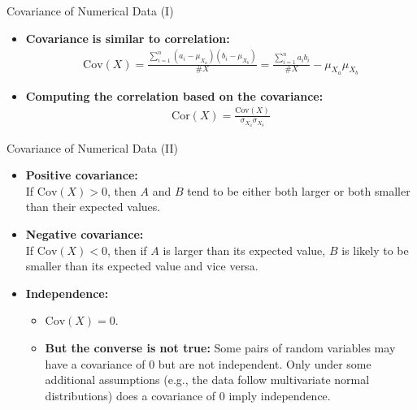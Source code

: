 \begin{frame}{Covariance of Numerical Data (I)}
	\begin{itemize}
		\item \textbf{\color{airforceblue}Covariance} \textbf{is similar to
			      correlation:}\\
		      \begin{align}
			      \text{Cov}(X) =
			      \frac{\sum_{i=1}^{n}(a_i-\mu_{X_a})(b_i-\mu_{X_b})}{\#X} =
			      \frac{\sum_{i=1}^{n}a_ib_i}{\#X}-\mu_{X_a}\mu_{X_b}
		      \end{align}
		\item \textbf{Computing the correlation based on the covariance:}\\
		      \begin{align}
			      \text{Cor}({X}) = \frac{\text{Cov}(X)}{\sigma_{X_a}\sigma_{X_b}}
		      \end{align}
	\end{itemize}
\end{frame}

\begin{frame}{Covariance of Numerical Data (II)}
	\begin{itemize}
		\item \textbf{Positive covariance:}\\
		      If $\text{Cov}(X) > 0$, then $A$ and $B$ tend to be either both
		      larger or both smaller than their expected values.
		\item \textbf{Negative covariance:}\\
		      If $\text{Cov}(X) < 0$, then if $A$ is larger than its expected
		      value, $B$ is likely to be smaller than its expected value and vice
		      versa.
		\item \textbf{Independence:}
		      \begin{itemize}
			      \item $\text{Cov}(X) = 0$.
			      \item \textbf{\color{airforceblue}But the converse is not true:}
			            Some pairs of random variables may have a covariance of $0$ but are
			            not independent. Only under some additional assumptions (e.g., the
			            data follow multivariate normal distributions) does a covariance of
			            $0$ imply independence.
		      \end{itemize}
	\end{itemize}
\end{frame}

